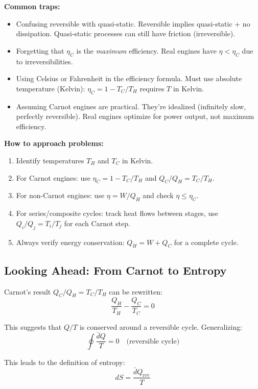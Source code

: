 \documentclass[9pt,twocoloumn]{article}
\begin{document}
\textbf{Common traps:}
\begin{itemize}
    \item Confusing reversible with quasi-static. Reversible implies quasi-static + no dissipation. Quasi-static processes can still have friction (irreversible).
    \item Forgetting that $\eta_C$ is the \emph{maximum} efficiency. Real engines have $\eta < \eta_C$ due to irreversibilities.
    \item Using Celsius or Fahrenheit in the efficiency formula. Must use absolute temperature (Kelvin): $\eta_C = 1 - T_C/T_H$ requires $T$ in Kelvin.
    \item Assuming Carnot engines are practical. They're idealized (infinitely slow, perfectly reversible). Real engines optimize for power output, not maximum efficiency.
\end{itemize}

\textbf{How to approach problems:}
\begin{enumerate}
    \item Identify temperatures $T_H$ and $T_C$ in Kelvin.
    \item For Carnot engines: use $\eta_C = 1 - T_C/T_H$ and $Q_C/Q_H = T_C/T_H$.
    \item For non-Carnot engines: use $\eta = W/Q_H$ and check $\eta \leq \eta_C$.
    \item For series/composite cycles: track heat flows between stages, use $Q_i/Q_j = T_i/T_j$ for each Carnot step.
    \item Always verify energy conservation: $Q_H = W + Q_C$ for a complete cycle.
\end{enumerate}

\subsection{Looking Ahead: From Carnot to Entropy}

Carnot's result $Q_C/Q_H = T_C/T_H$ can be rewritten:
\begin{equation}
\frac{Q_H}{T_H} - \frac{Q_C}{T_C} = 0
\end{equation}

This suggests that $Q/T$ is conserved around a reversible cycle. Generalizing:
\begin{equation}
\oint \frac{\bar{d}Q}{T} = 0 \quad \text{(reversible cycle)}
\end{equation}

This leads to the definition of entropy:
\begin{equation}
dS = \frac{\bar{d}Q_{\text{rev}}}{T}
\end{equation}
\end{document}
